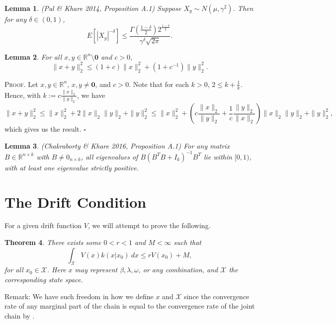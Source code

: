 \documentclass[12pt]{article}
\newtheorem{theorem}{Theorem}
\newtheorem{lemma}[theorem]{Lemma}
\newcounter{ProofCounter}
\newenvironment{Proof}{\stepcounter{ProofCounter}\textsc{Proof.}}{\hfill$\square$}
\begin{document}
\begin{lemma}
  (Pal \& Khare 2014, Proposition A.1)
  Suppose $X_{y} \sim N(\mu, \gamma^2)$. Then for any $\delta \in (0,1)$, 
  \[
    E\left[ |X_{y}|^{-\delta} \right] \leq \frac{\Gamma\left( \frac{1-\delta}{2} \right) 2^{\frac{1-\delta}{2}}}{\gamma^\delta \sqrt{2\pi}}.
  \]
  \label{l6}
\end{lemma}

\begin{lemma}
  For all $x,y \in \mathbb{R}^n \setminus \bm{0}$ and $c > 0$, 
  \[
    \|x + y\|_2^2 \leq (1 + c) \|x\|_2^2 + (1 + c^{-1})\|y\|_2^2.
  \]
  \label{l7}
\end{lemma}
\begin{Proof}
  Let $x, y \in \mathbb{R}^n$, $x, y \neq \bm{0}$, and $c > 0$. Note that for each $k > 0$, $2 \leq k + \frac{1}{k}$. Hence, with $k := c \frac{\|x\|_2}{\|y\|_2}$, we have
  \[
    \|x + y\|_2^2 \leq \|x\|_2^2 + 2\|x\|_2 \|y\|_2 + \|y\|_2^2 \leq \|x\|_2^2 + \left( c\frac{\|x\|_2}{\|y\|_2} + \frac{1}{c}\frac{\|y\|_2}{\|x\|_2}
    \right)\|x\|_2 \|y\|_2 + \|y\|_2^2,
  \]
  which gives us the result.
\end{Proof}

\begin{lemma}
  (Chakraborty \& Khare 2016, Proposition A.1)
  For any matrix $B \in \mathbb{R}^{n\times k}$ with $B \neq 0_{n\times k}$, all eigenvalues of $B(B^T B + I_{k})^{-1}B^T$ lie within $[0,1)$, with at
  least one eigenvalue strictly positive.
  \label{l8}
\end{lemma}



\section{The Drift Condition}

For a given drift function $V$, we will attempt to prove the following. \\

\begin{theorem}
  There exists some $0 < r < 1$ and $M < \infty$ such that 
  \[
    \int_{\mathcal{X}} V(x)k(x|x_0)\ dx \leq r V(x_0) + M,
  \]
  for all $x_0 \in \mathcal{X}$. Here $x$ may represent $\beta, \lambda, \omega$, or any combination, and $\mathcal{X}$ the corresponding state space.
  \label{thm1}
\end{theorem}

Remark: We have such freedom in how we define $x$ and $\mathcal{X}$ since the convergence rate of any marginal part of the chain is equal to the convergence rate
of the joint chain by \cite{jointvmarg}.
\end{document}
